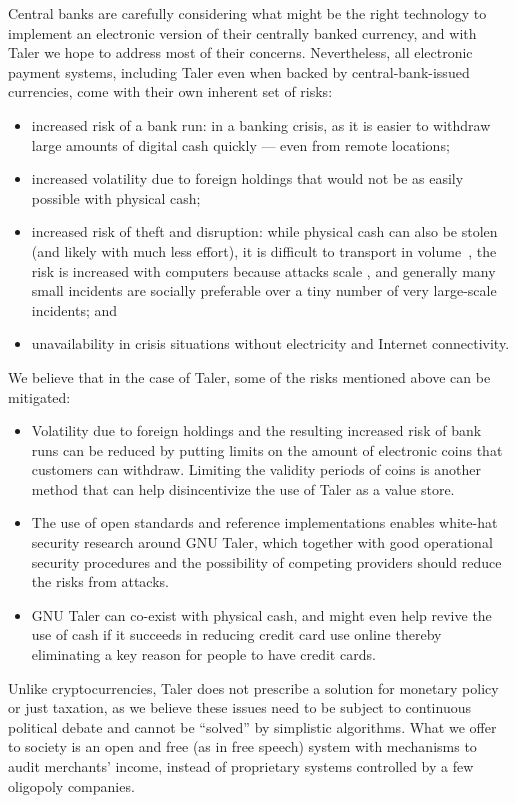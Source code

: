 Central banks are carefully considering what might be the right
technology to implement an electronic version of their centrally
banked currency, and with Taler we hope to address most of their concerns.
Nevertheless, all electronic payment systems, including Taler even
when backed by central-bank-issued currencies, come with their own
inherent set of risks:~\cite{riksbank2017riksbank}

\begin{itemize}
  \item increased risk of a bank run: in a banking crisis,
    as it is easier to withdraw large amounts of digital
    cash quickly --- even from remote locations;
  \item increased volatility due to foreign holdings that would
    not be as easily possible with physical cash;
  \item increased risk of theft and disruption: while physical
    cash can also be stolen (and likely with much less effort), it is
    difficult to transport in volume~\cite{force2015money}, the
    risk is increased with computers because attacks scale \cite{hammer2018billion}, and
    generally many small incidents are socially preferable over a
    tiny number of very large-scale incidents; and
  \item unavailability in crisis situations without electricity and Internet
    connectivity.
\end{itemize}


We believe that in the case of Taler, some of the risks mentioned
above can be mitigated:
\begin{itemize}
 \item Volatility due to foreign holdings and the resulting increased
   risk of bank runs can be reduced by putting limits on the amount of
   electronic coins that customers can withdraw.  Limiting the
   validity periods of coins is another method that can help
   disincentivize the use of Taler as a value store.
 \item The use of open standards and reference implementations enables
   white-hat security research around GNU Taler, which together with
   good operational security procedures and the possibility of
   competing providers should reduce the risks from attacks.
 \item GNU Taler can co-exist with physical cash, and might even
   help revive the use of cash if it succeeds in reducing credit
   card use online thereby eliminating a key reason for people to
   have credit cards.
\end{itemize}

Unlike cryptocurrencies, Taler does not prescribe a solution for monetary
policy or just taxation, as we believe these issues need to be subject to
continuous political debate and cannot be ``solved'' by simplistic algorithms.
What we offer to society is an open and free (as in free speech) system with
mechanisms to audit merchants' income, instead of proprietary systems
controlled by a few oligopoly companies.
